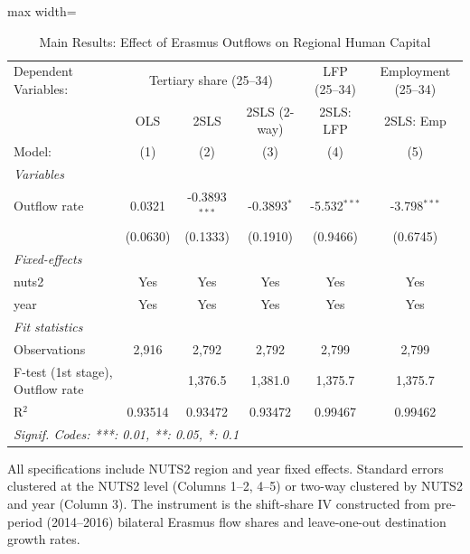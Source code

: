 \begin{table}[htbp]
   \caption{\label{tab:main} Main Results: Effect of Erasmus Outflows on Regional Human Capital}
   \centering
   \scriptsize
   \begin{adjustbox}{max width=\textwidth}
   \begin{tabular}{lccccc}
      \tabularnewline \midrule \midrule
      Dependent Variables: & \multicolumn{3}{c}{Tertiary share (25--34)} & LFP (25--34) & Employment (25--34)\\
                                       & OLS      & 2SLS            & 2SLS (2-way)  & 2SLS: LFP      & 2SLS: Emp \\   
      Model:                           & (1)      & (2)             & (3)           & (4)            & (5)\\  
      \midrule
      \emph{Variables}\\
      Outflow rate                     & 0.0321   & -0.3893$^{***}$ & -0.3893$^{*}$ & -5.532$^{***}$ & -3.798$^{***}$\\   
                                       & (0.0630) & (0.1333)        & (0.1910)      & (0.9466)       & (0.6745)\\   
      \midrule
      \emph{Fixed-effects}\\
      nuts2                            & Yes      & Yes             & Yes           & Yes            & Yes\\  
      year                             & Yes      & Yes             & Yes           & Yes            & Yes\\  
      \midrule
      \emph{Fit statistics}\\
      Observations                     & 2,916    & 2,792           & 2,792         & 2,799          & 2,799\\  
      F-test (1st stage), Outflow rate &          & 1,376.5         & 1,381.0       & 1,375.7        & 1,375.7\\  
      R$^2$                            & 0.93514  & 0.93472         & 0.93472       & 0.99467        & 0.99462\\  
      \midrule \midrule
      \multicolumn{6}{l}{\emph{Signif. Codes: ***: 0.01, **: 0.05, *: 0.1}}\\
   \end{tabular}
   \end{adjustbox}
   
   \par \raggedright 
   All specifications include NUTS2 region and year fixed effects. Standard errors clustered at the NUTS2 level (Columns 1--2, 4--5) or two-way clustered by NUTS2 and year (Column 3). The instrument is the shift-share IV constructed from pre-period (2014--2016) bilateral Erasmus flow shares and leave-one-out destination growth rates.
\end{table}
